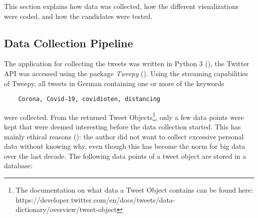 This section explains how data was collected, how the different visualizations were coded, and how the candidates were tested.

\subsection{Data Collection Pipeline}

The application for collecting the tweets was written in Python 3 (\cite{10.5555/1593511}), the Twitter API was accessed using the package \emph{Tweepy} (\cite{roesslein2020tweepy}). Using the streaming capabilities of Tweepy, all tweets in German containing one or more of the keywords \begin{verbatim}
    Corona, Covid-19, covidioten, distancing
\end{verbatim}
were collected. From the returned Tweet Objects\footnote{The documentation on what data a Tweet Object contains can be found here: https://developer.twitter.com/en/docs/tweets/data-dictionary/overview/tweet-object}, only a few data points were kept that were deemed interesting before the data collection started. This has mainly ethical reasons (\cite{richards2014big}): the author did not want to collect excessive personal data without knowing why, even though this has become the norm for big data over the last decade. The following data points of a tweet object are stored in a database:

